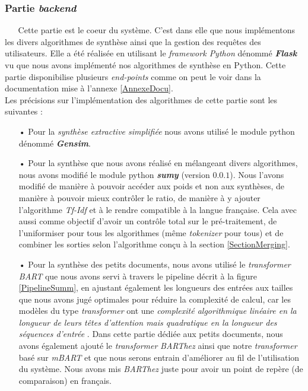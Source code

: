 \subsubsection{Partie \textit{backend}}
$ _{} $ $ _{} $ $ _{} $ $ _{} $ $ _{} $Cette partie est le coeur du système. C'est dans elle que nous implémentons les divers algorithmes de synthèse ainsi que la gestion des requêtes des utilisateurs. Elle a été réalisée en utilisant le \textit{framework Python} dénommé \textit{\textbf{Flask}} vu que nous avons implémenté nos algorithmes de synthèse en Python. Cette partie disponibilise plusieurs \textit{end-points} comme on peut le voir dans la documentation mise à l'annexe \ref{AnnexeDocu}.\\
Les précisions sur l'implémentation des algorithmes de cette partie sont les suivantes :
\begin{itemize}
\item[•] Pour la \textit{synthèse extractive simplifiée} nous avons utilisé le module python dénommé \textit{\textbf{Gensim}}.
\item[•] Pour la synthèse que nous avons réalisé en mélangeant divers algorithmes, nous avons modifié le module python \textit{\textbf{sumy}} (version $ 0.0.1 $). Nous l'avons modifié de manière à pouvoir accéder aux poids et non aux synthèses, de manière à pouvoir mieux contrôler le ratio, de manière à y ajouter l'algorithme \textit{Tf-Idf} et à le rendre compatible à la langue française. Cela avec aussi comme objectif d'avoir un contrôle total sur le pré-traitement, de l'uniformiser pour tous les algorithmes (même \textit{tokenizer} pour tous) et de combiner les sorties selon l'algorithme conçu à la section \ref{SectionMerging}.
\item[•] Pour la synthèse des petits documents, nous avons utilisé le \textit{transformer} \textit{BART} que nous avons servi à travers le pipeline décrit à la figure \ref{PipelineSumm}, en ajustant également les longueurs des entrées aux tailles que nous avons jugé optimales pour réduire la complexité de calcul, car les modèles du type \textit{transformer} ont une \textit{complexité algorithmique linéaire en la longueur de leurs têtes d'attention mais quadratique en la longueur des séquences d'entrée} \cite{vaswani2017attention}. Dans cette partie dédiée aux petits documents, nous avons également ajouté le \textit{transformer} \textit{BARThez} ainsi que notre \textit{transformer} basé sur \textit{mBART} et que nous serons entrain d'améliorer au fil de l'utilisation du système. Nous avons mis \textit{BARThez} juste pour avoir un point de repère (de comparaison) en français.\\

\end{itemize}
